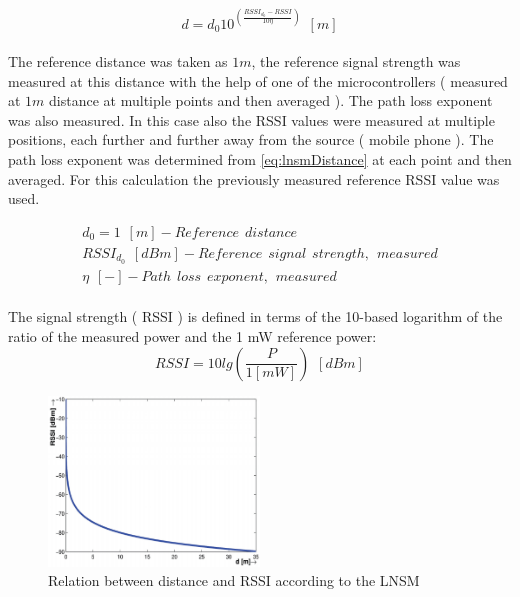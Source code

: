 \documentclass[11pt,a4paper]{article}
\begin{document}
\begin{equation}
    d = d_0 10^{\left(\frac{RSSI_{d_0}-RSSI}{10 \eta}\right)} \hspace{5pt} [m]
    \label{eq:lnsmDistance}
\end{equation}\\


The reference distance was taken as $1 m$, the reference signal strength was measured at this distance with the help of one of the microcontrollers ( measured at $1 m$ distance at multiple points and then averaged ). The path loss exponent was also measured. In this case also the RSSI values were measured at multiple positions, each further and further away from the source ( mobile phone ). The path loss exponent was determined from \ref{eq:lnsmDistance} at each point and then averaged. For this calculation the previously measured reference RSSI value was used.

\begin{gather*}
    d_0 = 1 \hspace{5pt} [m] - Reference \hspace{5pt} distance \\
    RSSI_{d_0} \hspace{5pt} [dBm] - Reference \hspace{5pt} signal \hspace{5pt} strength, \hspace{5pt} measured \\
    \eta \hspace{5pt} [-] - Path \hspace{5pt} loss \hspace{5pt} exponent, \hspace{5pt} measured
\end{gather*}\\


The signal strength ( RSSI ) is defined in terms of the 10-based logarithm of the ratio of the measured power and the 1 mW reference power:\\

\begin{equation*}
    RSSI = 10 lg\left(\frac{P}{1 [mW]}\right) \hspace{5pt} [dBm]
\end{equation*}

\begin{figure}[H]
    \centering
    \includegraphics[width = 0.5\textwidth]{figures/idealRelationBetweenRSSIandDistance.PNG}
    \caption{Relation between distance and RSSI according to the LNSM \cite{BottaSimek}}
    \label{fig:rssiAndDistance}
\end{figure}
\end{document}
